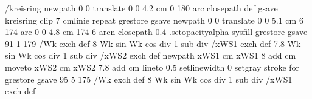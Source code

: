 {{/kreisring { newpath
                      0 0 translate
                      0 0 4.2 cm 0 180 arc
                     closepath
                    } def
               gsave
                        kreisring clip
                        7 {cmlinie} repeat
              grestore
   gsave
                 newpath
                      0 0 translate
                      0 0 5.1 cm 6 174 arc
                      0 0 4.8 cm 174 6 arcn
                 closepath
                    \pst@usecolor\ProLineCol
                       0.4 .setopacityalpha
                       sysfill
   grestore
 gsave
   91 1 179 { /Wk exch def %
                       {8 Wk sin Wk cos div 1 sub div} /xWS1 exch def %
                       {7.8 Wk sin Wk cos div 1 sub div} /xWS2 exch def %
                        newpath
                        xWS1 cm xWS1 8 add cm moveto %
                        xWS2 cm xWS2 7.8 add cm %
                       lineto
                       0.5 setlinewidth
                       0 setgray
                       stroke
                   } for
  grestore
  gsave
     95 5 175 { /Wk exch def
                        {8 Wk sin Wk cos div 1 sub div} /xWS1 exch def
}}}
